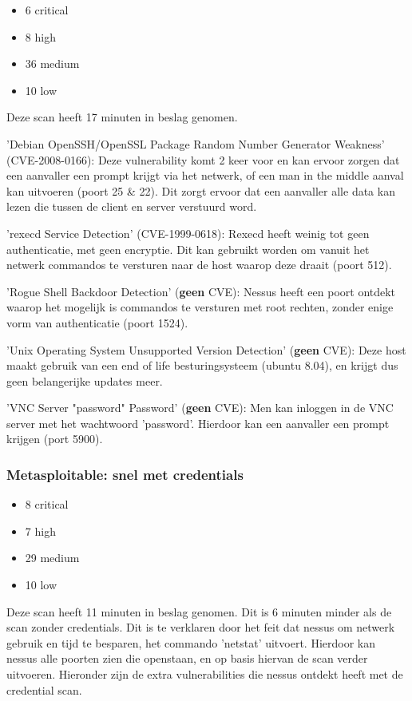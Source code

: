 \begin{itemize}
\item 6 critical
\item 8 high
\item 36 medium
\item 10 low
\end{itemize}

Deze scan heeft 17 minuten in beslag genomen.

'Debian OpenSSH/OpenSSL Package Random Number Generator Weakness' (CVE-2008-0166): Deze vulnerability komt 2 keer voor en kan ervoor zorgen dat een aanvaller een prompt krijgt via het netwerk, of een man in the middle aanval kan uitvoeren (poort 25 \& 22). Dit zorgt ervoor dat een aanvaller alle data kan lezen die tussen de client en server verstuurd word.

'rexecd Service Detection' (CVE-1999-0618): Rexecd heeft weinig tot geen authenticatie, met geen encryptie. Dit kan gebruikt worden om vanuit het netwerk commandos te versturen naar de host waarop deze draait (poort 512). 

'Rogue Shell Backdoor Detection' (\textbf{geen} CVE): Nessus heeft een poort ontdekt waarop het mogelijk is commandos te versturen met root rechten, zonder enige vorm van authenticatie  (poort 1524).

'Unix Operating System Unsupported Version Detection' (\textbf{geen} CVE): Deze host maakt gebruik van een end of life besturingsysteem (ubuntu 8.04), en krijgt dus geen belangerijke updates meer.

'VNC Server "password" Password' (\textbf{geen} CVE): Men kan inloggen in de VNC server met het wachtwoord 'password'. Hierdoor kan een aanvaller een prompt krijgen (port 5900).

\subsubsection{Metasploitable: snel met credentials}

\begin{itemize}
\item 8 critical
\item 7 high
\item 29 medium
\item 10 low
\end{itemize}

Deze scan heeft 11 minuten in beslag genomen. Dit is 6 minuten minder als de scan zonder credentials. Dit is te verklaren door het feit dat nessus om netwerk gebruik en tijd te besparen, het commando 'netstat' uitvoert. Hierdoor kan nessus alle poorten zien die openstaan, en op basis hiervan de scan verder uitvoeren. Hieronder zijn de extra vulnerabilities die nessus ontdekt heeft met de credential scan.

